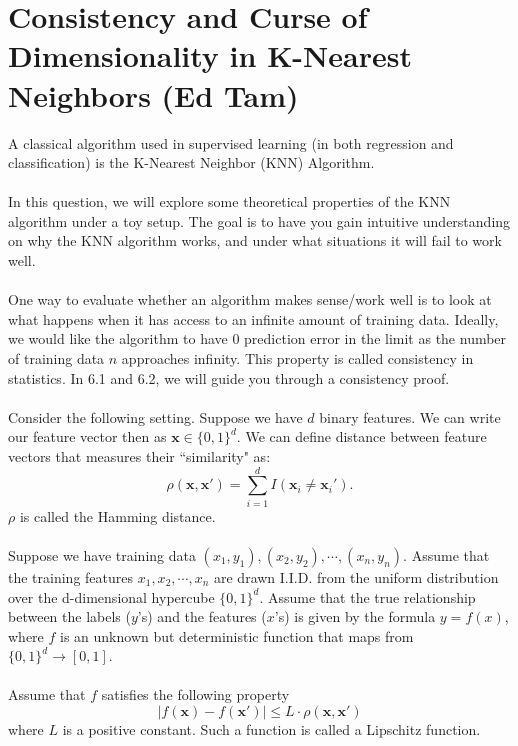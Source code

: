 \documentclass{exam}
\begin{document}
\section{Consistency and Curse of Dimensionality in K-Nearest Neighbors (Ed Tam)}
A classical algorithm used in supervised learning (in both regression and classification) is the K-Nearest Neighbor (KNN) Algorithm. \\\\
In this question, we will explore some theoretical properties of the KNN algorithm under a toy setup. The goal is to have you gain intuitive understanding on why the KNN algorithm works, and under what situations it will fail to work well. \\\\
One way to evaluate whether an algorithm makes sense/work well is to look at what happens when it has access to an infinite amount of training data. Ideally, we would like the algorithm to have 0 prediction error in the limit as the number of training data $n$ approaches infinity. This property is called consistency in statistics. In 6.1 and 6.2, we will guide you through a consistency proof. \\\\
Consider the following setting. Suppose we have $d$ binary features. We can write our feature vector then as $\textbf{x} \in \{0, 1\}^d$. We can define distance between feature vectors that measures their ``similarity" as: 
$$\rho(\textbf{x}, \textbf{x}') = \sum_{i = 1}^d I(\textbf{x}_i \neq \textbf{x}_i').$$
$\rho$ is called the Hamming distance. 
\\\\
Suppose we have training data $(x_1, y_1), (x_2, y_2), \cdots, (x_n, y_n)$. Assume that the training features $x_1, x_2, \cdots, x_n$ are drawn I.I.D. from the uniform distribution over the d-dimensional hypercube $\{0, 1\}^d$. Assume that the true relationship between the labels ($y$'s) and the features ($x$'s) is given by the formula $y = f(x)$, where $f$ is an unknown but deterministic function that maps from $\{0, 1\}^d \to [0,1]$. \\\\Assume that $f$ satisfies the following property 
$$|f(\textbf{x}) - f(\textbf{x}')| \leq L \cdot\rho(\textbf{x}, \textbf{x}')$$ where $L$ is a positive constant. Such a function is called a Lipschitz function. 
\end{document}
